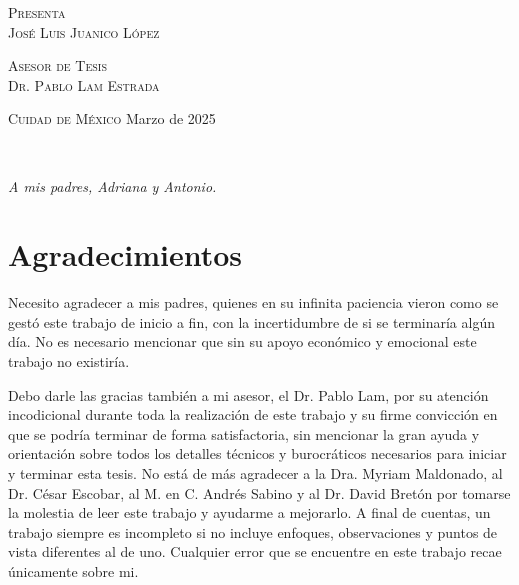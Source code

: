 \vspace{5pt}

\begin{center}
    \begin{minipage}{0.7\textwidth}
        \centering
        {\normalsize\textsc{Presenta}} \\
        {\Large\textsc{José Luis Juanico López}}
        \medskip
    \end{minipage}
\end{center}

\hspace{10pt}

\begin{center}
    \begin{minipage}{0.7\textwidth}
        \centering
        {\normalsize\textsc{Asesor de Tesis}} \\
        {\normalsize\textsc{Dr. Pablo Lam Estrada}}
        \medskip
    \end{minipage}
\end{center}

\vfill

\begin{center}
    \begin{minipage}{0.8\textwidth}
        {\normalsize\textsc{Cuidad de México} \hfill {\small Marzo de 2025}}
    \end{minipage}
\end{center}

\newpage
\thispagestyle{empty}
\

\newpage
{}
\thispagestyle{empty}
\hfill\textit{A mis padres, Adriana y Antonio.}
\newpage
\thispagestyle{empty}
\

\newpage
{}
\thispagestyle{plain}
\section*{Agradecimientos}

Necesito agradecer a mis padres, quienes en su infinita paciencia vieron como se gestó este trabajo de inicio a fin, con la incertidumbre de si se terminaría algún día. No es necesario mencionar que sin su apoyo económico y emocional este trabajo no existiría.
\bigskip

Debo darle las gracias también a mi asesor, el Dr. Pablo Lam, por su atención incodicional durante toda la realización de este trabajo y su firme convicción en que se podría terminar de forma satisfactoria, sin mencionar la gran ayuda y orientación sobre todos los detalles técnicos y burocráticos necesarios para iniciar y terminar esta tesis. No está de más agradecer a la Dra. Myriam Maldonado, al Dr. César Escobar, al M. en C. Andrés Sabino y al Dr. David Bretón por tomarse la molestia de leer este trabajo y ayudarme a mejorarlo. A final de cuentas, un trabajo siempre es incompleto si no incluye enfoques, observaciones y puntos de vista diferentes al de uno. Cualquier error que se encuentre en este trabajo recae únicamente sobre mi.
\bigskip

